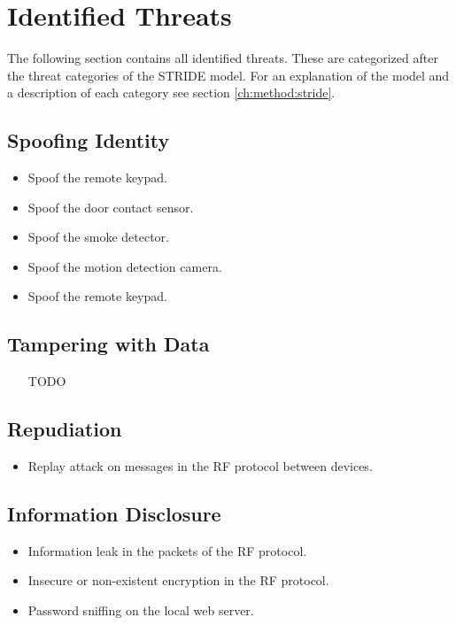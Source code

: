 \section{Identified Threats} \label{ch:threat-model:threats}
The following section contains all identified threats. These are categorized after the threat categories of the STRIDE model. For an explanation of the model and a description of each category see section \ref{ch:method:stride}.

\subsection{Spoofing Identity}
\begin{itemize}
    \item Spoof the remote keypad.
    \item Spoof the door contact sensor.
    \item Spoof the smoke detector.
    \item Spoof the motion detection camera.
    \item Spoof the remote keypad.
\end{itemize}

\subsection{Tampering with Data}
\begin{itemize}
    \item [TODO]
\end{itemize}

\subsection{Repudiation}
\begin{itemize}
    \item Replay attack on messages in the RF protocol between devices.
\end{itemize}

\subsection{Information Disclosure}
\begin{itemize}
    \item Information leak in the packets of the \gls{RF} protocol.
    \item Insecure or non-existent encryption in the \gls{RF} protocol.
    \item Password sniffing on the local web server.
\end{itemize}

